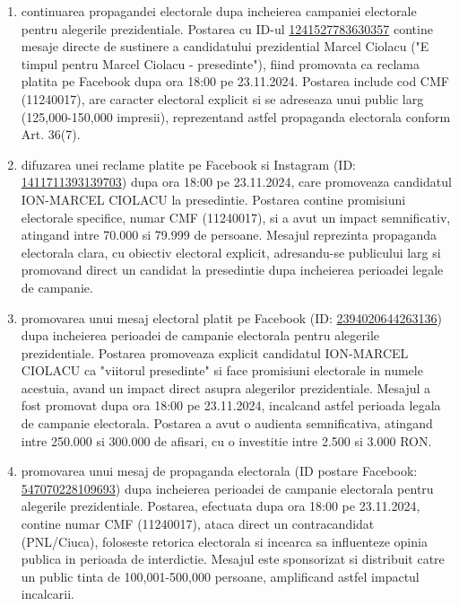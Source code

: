 \documentclass[a4paper,12pt]{article}
\begin{document}
\begin{enumerate}[leftmargin=*, label=\arabic*.)]
    \item continuarea propagandei electorale dupa incheierea campaniei electorale pentru alegerile prezidentiale. Postarea cu ID-ul \href{https://www.facebook.com/ads/library/?id=1241527783630357}{1241527783630357} contine mesaje directe de sustinere a candidatului prezidential Marcel Ciolacu ("E timpul pentru Marcel Ciolacu - presedinte"), fiind promovata ca reclama platita pe Facebook dupa ora 18:00 pe 23.11.2024. Postarea include cod CMF (11240017), are caracter electoral explicit si se adreseaza unui public larg (125,000-150,000 impresii), reprezentand astfel propaganda electorala conform Art. 36(7).
    \item difuzarea unei reclame platite pe Facebook si Instagram (ID: \href{https://www.facebook.com/ads/library/?id=1411711393139703}{1411711393139703}) dupa ora 18:00 pe 23.11.2024, care promoveaza candidatul ION-MARCEL CIOLACU la presedintie. Postarea contine promisiuni electorale specifice, numar CMF (11240017), si a avut un impact semnificativ, atingand intre 70.000 si 79.999 de persoane. Mesajul reprezinta propaganda electorala clara, cu obiectiv electoral explicit, adresandu-se publicului larg si promovand direct un candidat la presedintie dupa incheierea perioadei legale de campanie.
    \item promovarea unui mesaj electoral platit pe Facebook (ID: \href{https://www.facebook.com/ads/library/?id=2394020644263136}{2394020644263136}) dupa incheierea perioadei de campanie electorala pentru alegerile prezidentiale. Postarea promoveaza explicit candidatul ION-MARCEL CIOLACU ca "viitorul presedinte" si face promisiuni electorale in numele acestuia, avand un impact direct asupra alegerilor prezidentiale. Mesajul a fost promovat dupa ora 18:00 pe 23.11.2024, incalcand astfel perioada legala de campanie electorala. Postarea a avut o audienta semnificativa, atingand intre 250.000 si 300.000 de afisari, cu o investitie intre 2.500 si 3.000 RON.
    \item promovarea unui mesaj de propaganda electorala (ID postare Facebook: \href{https://www.facebook.com/ads/library/?id=547070228109693}{547070228109693}) dupa incheierea perioadei de campanie electorala pentru alegerile prezidentiale. Postarea, efectuata dupa ora 18:00 pe 23.11.2024, contine numar CMF (11240017), ataca direct un contracandidat (PNL/Ciuca), foloseste retorica electorala si incearca sa influenteze opinia publica in perioada de interdictie. Mesajul este sponsorizat si distribuit catre un public tinta de 100,001-500,000 persoane, amplificand astfel impactul incalcarii.
\end{enumerate}
\end{document}
